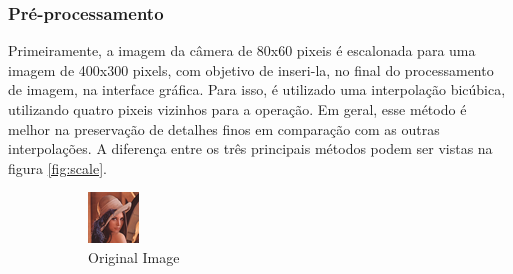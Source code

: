 		\subsubsection{Pré-processamento}
		
		Primeiramente, a imagem da câmera de 80x60 pixeis é escalonada para uma imagem de 400x300 pixels, com objetivo de inseri-la, no final do processamento de imagem, na interface gráfica. Para isso, é utilizado uma interpolação bicúbica, utilizando quatro pixeis vizinhos para a operação. Em geral, esse método é melhor na preservação de detalhes finos em comparação com as outras interpolações. A diferença entre os três principais métodos podem ser vistas na figura \ref{fig:scale}.

 \begin{figure}
        \centering
        \begin{subfigure}[b]{0.475\textwidth}
            \centering
            \includegraphics[width=\textwidth]{Figures/lena_tiny.png}
            \caption[Network2]%
            {{\small Original Image}}    
            \label{fig:int1}
        \end{subfigure}
        \hfill
        \begin{subfigure}[b]{0.475\textwidth}  
            \centering 

\end{subfigure}
\end{figure}
